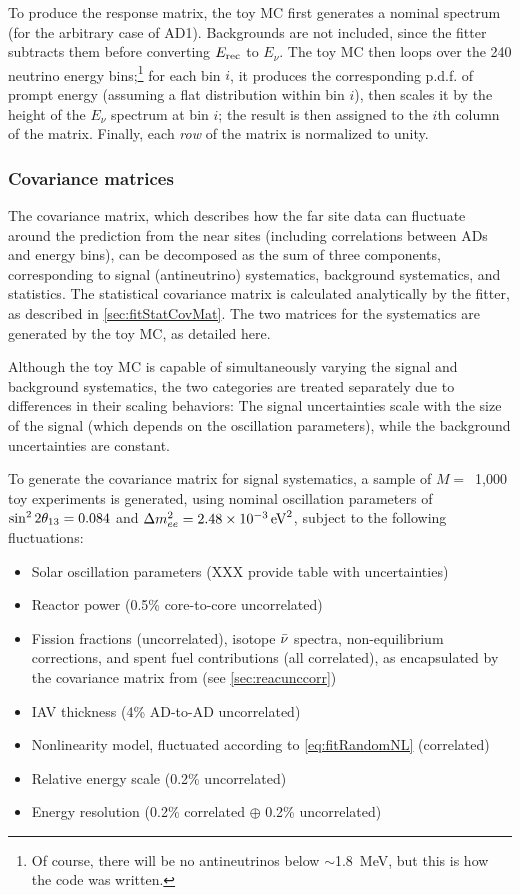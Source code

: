 \documentclass[../thesis.tex]{subfiles}
\begin{document}
To produce the response matrix, the toy MC first generates a nominal spectrum
(for the arbitrary case of AD1). Backgrounds are not included, since the fitter
subtracts them before converting $E_\mathrm{rec}$ to $E_\nu$. The toy MC then loops over
the 240 neutrino energy bins;\footnote{Of course, there will be no antineutrinos
  below $\sim$1.8~MeV, but this is how the code was written.} for each bin $i$,
it produces the corresponding p.d.f. of prompt energy (assuming a flat
distribution within bin $i$), then scales it by the height of the $E_\nu$
spectrum at bin $i$; the result is then assigned to the $i$th column of the
matrix. Finally, each \emph{row} of the matrix is normalized to unity.

\subsubsection{Covariance matrices}

The covariance matrix, which describes how the far site data can fluctuate
around the prediction from the near sites (including correlations between ADs
and energy bins), can be decomposed as the sum of three components,
corresponding to signal (antineutrino) systematics, background systematics, and
statistics. The statistical covariance matrix is calculated analytically by the
fitter, as described in \autoref{sec:fitStatCovMat}. The two matrices for the
systematics are generated by the toy MC, as detailed here.

Although the toy MC is capable of simultaneously varying the signal and
background systematics, the two categories are treated separately due to
differences in their scaling behaviors: The signal uncertainties scale with the
size of the signal (which depends on the oscillation parameters), while the
background uncertainties are constant.

To generate the covariance matrix for signal systematics, a sample of $M
=$~1,000 toy experiments is generated, using nominal oscillation parameters of
$\sin^2 2\theta_{13} = 0.084$ and $\Delta m^2_{ee} = \SI{2.48e-3}{eV^2}$, subject to the following
fluctuations:

\begin{itemize}
\item Solar oscillation parameters (XXX provide table with uncertainties)
\item Reactor power (0.5\% core-to-core uncorrelated)
\item Fission fractions (uncorrelated), isotope $\bar\nu$ spectra,
  non-equilibrium corrections, and spent fuel contributions (all correlated), as
  encapsulated by the covariance matrix from \cite{Lewis} (see
  \autoref{sec:reacunccorr})
\item IAV thickness (4\% AD-to-AD uncorrelated)
\item Nonlinearity model, fluctuated according to \autoref{eq:fitRandomNL}
  (correlated)
\item Relative energy scale (0.2\% uncorrelated)
\item Energy resolution (0.2\% correlated $\oplus$ 0.2\% uncorrelated)
\end{itemize}
\end{document}
